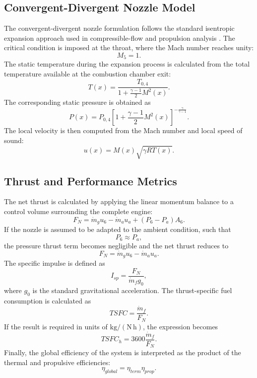 \documentclass[preprint,12pt]{elsarticle}
\begin{document}
\subsection{Convergent-Divergent Nozzle Model}
The convergent-divergent nozzle formulation follows the standard isentropic expansion approach used in compressible-flow and propulsion analysis \cite{Anderson1990,Mattingly2006}. The critical condition is imposed at the throat, where the Mach number reaches unity:
\begin{equation}
M_5 = 1.
\end{equation}
The static temperature during the expansion process is calculated from the total temperature available at the combustion chamber exit:
\begin{equation}
T(x)=
\frac{T_{0,4}}
{1+\frac{\gamma-1}{2}M^2(x)}.
\end{equation}
The corresponding static pressure is obtained as
\begin{equation}
P(x)=P_{0,4}
\left[
1+\frac{\gamma-1}{2}M^2(x)
\right]^{-\frac{\gamma}{\gamma-1}}.
\end{equation}
The local velocity is then computed from the Mach number and local speed of sound:
\begin{equation}
u(x)=M(x)\sqrt{\gamma R T(x)}.
\end{equation}
\subsection{Thrust and Performance Metrics}
The net thrust is calculated by applying the linear momentum balance to a control volume surrounding the complete engine:
\begin{equation}
F_N = \dot{m}_g u_6 - \dot{m}_a u_a + (P_6-P_a)A_6.
\label{eq:net_thrust}
\end{equation}
If the nozzle is assumed to be adapted to the ambient condition, such that
\begin{equation}
P_6 \approx P_a,
\end{equation}
the pressure thrust term becomes negligible and the net thrust reduces to
\begin{equation}
F_N = \dot{m}_g u_6 - \dot{m}_a u_a.
\end{equation}
The specific impulse is defined as
\begin{equation}
I_{sp}=
\frac{F_N}{\dot{m}_f g_0},
\end{equation}
where $g_0$ is the standard gravitational acceleration.
The thrust-specific fuel consumption is calculated as
\begin{equation}
TSFC =
\frac{\dot{m}_f}{F_N}.
\end{equation}
If the result is required in units of $\mathrm{kg/(N\,h)}$, the expression becomes
\begin{equation}
TSFC_h =
3600 \frac{\dot{m}_f}{F_N}.
\end{equation}
Finally, the global efficiency of the system is interpreted as the product of the thermal and propulsive efficiencies:
\begin{equation}
\eta_{global}=\eta_{term}\eta_{prop}.
\end{equation}
\end{document}
